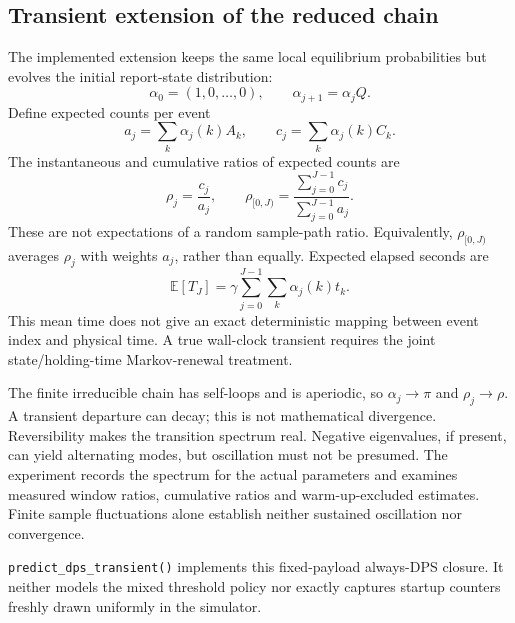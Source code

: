 \documentclass[11pt,a4paper]{article}
\begin{document}
\subsection{Transient extension of the reduced chain}
The implemented extension keeps the same local equilibrium probabilities
but evolves the initial report-state distribution:
\begin{equation}
\alpha_0=(1,0,\ldots,0),\qquad \alpha_{j+1}=\alpha_jQ.
\end{equation}
Define expected counts per event
\begin{equation}
a_j=\sum_k\alpha_j(k)A_k,\qquad
c_j=\sum_k\alpha_j(k)C_k.
\end{equation}
The instantaneous and cumulative ratios of expected counts are
\begin{equation}
\rho_j=\frac{c_j}{a_j},\qquad
\rho_{[0,J)}=\frac{\sum_{j=0}^{J-1}c_j}{\sum_{j=0}^{J-1}a_j}.
\end{equation}
These are not expectations of a random sample-path ratio. Equivalently,
$\rho_{[0,J)}$ averages $\rho_j$ with weights $a_j$, rather than equally.
Expected elapsed seconds are
\begin{equation}
\mathbb E[T_J]=\gamma\sum_{j=0}^{J-1}\sum_k\alpha_j(k)t_k.
\end{equation}
This mean time does not give an exact deterministic mapping between event
index and physical time. A true wall-clock transient requires the joint
state/holding-time Markov-renewal treatment.

The finite irreducible chain has self-loops and is aperiodic, so
$\alpha_j\to\pi$ and $\rho_j\to\rho$. A transient departure can decay;
this is not mathematical divergence. Reversibility makes the transition
spectrum real. Negative eigenvalues, if present, can yield alternating
modes, but oscillation must not be presumed. The experiment records the
spectrum for the actual parameters and examines measured window ratios,
cumulative ratios and warm-up-excluded estimates. Finite sample fluctuations
alone establish neither sustained oscillation nor convergence.

\texttt{predict\_dps\_transient()} implements this fixed-payload always-DPS
closure. It neither models the mixed threshold policy nor exactly captures
startup counters freshly drawn uniformly in the simulator.
\end{document}
